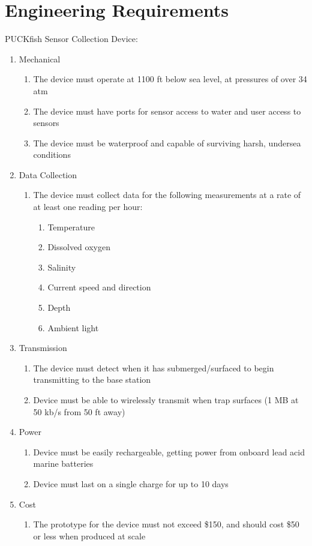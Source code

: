 \documentclass[12pt]{article}         %
\begin{document}
\section{Engineering Requirements}  %

PUCKfish Sensor Collection Device:
\begin{enumerate}
    \item Mechanical
    \begin{enumerate}
        \item The device must operate at 1100 ft below sea level, at pressures of over 34 atm
        \item The device must have ports for sensor access to water and user access to sensors
        \item The device must be waterproof and capable of surviving harsh, undersea conditions
    \end{enumerate}
    \item Data Collection
    \begin{enumerate}
        \item The device must collect data for the following measurements at a rate of at least one reading per hour:
        \begin{enumerate}
            \item Temperature
            \item Dissolved oxygen
            \item Salinity
            \item Current speed and direction
            \item Depth
            \item Ambient light
        \end{enumerate}
    \end{enumerate}
    \item Transmission
    \begin{enumerate}
        \item The device must detect when it has submerged/surfaced to begin transmitting to the base station
        \item Device must be able to wirelessly transmit when trap surfaces (1 MB at 50 kb/s from 50 ft away)
    \end{enumerate}
    \item Power
    \begin{enumerate}
        \item Device must be easily rechargeable, getting power from onboard lead acid marine batteries
        \item Device must last on a single charge for up to 10 days
    \end{enumerate}
    \item Cost
    \begin{enumerate}
        \item The prototype for the device must not exceed \$150, and should cost \$50 or less when produced at scale
    \end{enumerate}
\end{enumerate}
\end{document}
